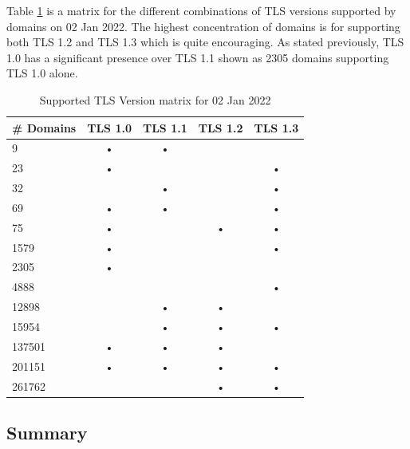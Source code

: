 \documentclass{mscreport}
\begin{document}
\vspace{0.3cm} \noindent
Table \ref{table:tls_supported_matrix} is a matrix for the different combinations of TLS versions supported by domains on 02 Jan 2022. The highest concentration of domains is for supporting both TLS 1.2 and TLS 1.3 which is quite encouraging. As stated previously, TLS 1.0 has a significant presence over TLS 1.1 shown as 2305 domains supporting TLS 1.0 alone.

\begin{table}[t]
  \begin{center}
    \begin{tabular}{|l|c|c|c|c|}  %
      \hline
      \textbf{\# Domains} & \textbf{TLS 1.0} & \textbf{TLS 1.1} & \textbf{TLS 1.2} & \textbf{TLS 1.3} \\
      \hline
      9      & • & • &  & \\
	  \hline
      23     & • &  &  & •\\
	  \hline
      32     &   & • &   & •\\
	  \hline
      69     & • & • &   & •\\
	  \hline
      75     & • &   & • & •\\
	  \hline
      1579   & • &   &   & •\\
	  \hline
      2305   & • &   &   &  \\
	  \hline
      4888   &   &   &   & •\\
	  \hline
      12898  &   & • & • &  \\
	  \hline
      15954  &   & • & • & •\\
	  \hline
      137501 & • & • & • &  \\
	  \hline
      201151 & • & • & • & •\\
	  \hline
      261762 &   &   & • & •\\
	  \hline
    \end{tabular}
    \caption{Supported TLS Version matrix for 02 Jan 2022}
    \label{table:tls_supported_matrix} %
  \end{center}
\end{table}


\subsection{Summary}
\end{document}
